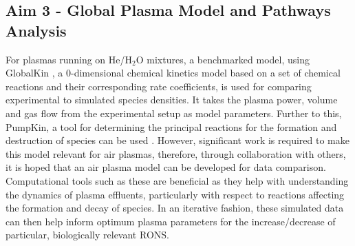 \documentclass[11pt, oneside]{article}   	%
\begin{document}


\subsection*{Aim 3 - Global Plasma Model and Pathways Analysis}
For plasmas running on He/H$_2$O mixtures, a benchmarked model, using GlobalKin \cite{Stafford2004O2}, a 0-dimensional chemical kinetics model based on a set of chemical reactions and their corresponding rate coefficients, is used for comparing experimental to simulated species densities. It takes the plasma power, volume and gas flow from the experimental setup as model parameters.
Further to this, PumpKin, a tool for determining the principal reactions for the formation and destruction of species can be used \cite{Markosyan2014PumpKin}.
However, significant work is required to make this model relevant for air plasmas, therefore, through collaboration with others, it is hoped that an air plasma model can be developed for data comparison.
Computational tools such as these are beneficial as they help with understanding the dynamics of plasma effluents, particularly with respect to reactions affecting the formation and decay of species. 
In an iterative fashion, these simulated data can then help inform optimum plasma parameters for the increase/decrease of particular, biologically relevant RONS.
\end{document}
